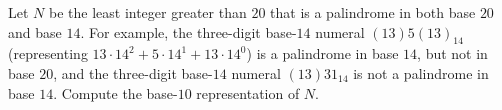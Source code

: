 Let $N$ be the least integer greater than $20$ that is a palindrome in both base $20$ and base $14$. For example, the three-digit base-$14$ numeral $\left(13\right)5\left(13\right)_{14}$ (representing $13\cdot14^2+5\cdot14^1+13\cdot14^0$) is a palindrome in base $14$, but not in base $20$, and the three-digit base-$14$ numeral $\left(13\right)31_{14}$ is not a palindrome in base $14$. Compute the base-$10$ representation of $N$.
